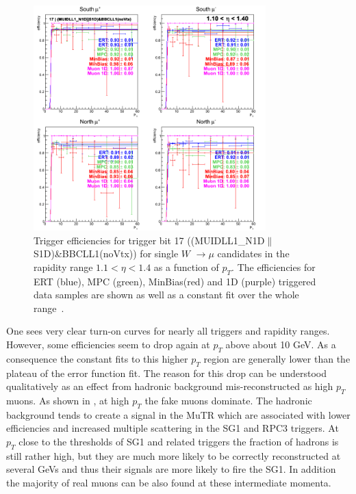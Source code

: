 \begin{figure}[ht]
  \centering
  \includegraphics[width=0.8\textwidth]{./figures/run13_trigeffipt_eta0_trig17_lin.png}
  \caption{
    Trigger efficiencies for trigger bit 17
    ((MUIDLL1\_N1D$\|$S1D)\&BBCLL1(noVtx)) for single $W$ $\rightarrow \mu$
    candidates in the rapidity range $ 1.1 < \eta < 1.4$ as a function of
    $p_T$. The efficiencies for ERT (blue), MPC (green),
    MinBias(red) and 1D (purple) triggered data samples are shown as well as a
    constant fit over the whole range~\cite{Seidl2014}.
  }
  \label{fig:run13_trigeffipt_eta0_nper0_trig17_lin} 
\end{figure}

One sees very clear turn-on curves for nearly all triggers and rapidity ranges.
However, some efficiencies seem to drop again at $p_T$ above about 10 GeV. As a
consequence the constant fits to this higher $p_T$ region are generally lower
than the plateau of the error function fit. The reason for this drop can be
understood qualitatively as an effect from hadronic background mis-reconstructed
as high $p_T$ muons. As shown in \cite{Seidl2012}, at high $p_T$ the fake muons
dominate. The hadronic background tends to create a signal in the MuTR which are
associated with lower efficiencies and increased multiple scattering in the SG1
and RPC3 triggers. At $p_T$ close to the thresholds of SG1 and related triggers
the fraction of hadrons is still rather high, but they are much more likely to
be correctly reconstructed at several GeVs and thus their signals are more
likely to fire the SG1. In addition the majority of real muons can be also found
at these intermediate momenta. 

